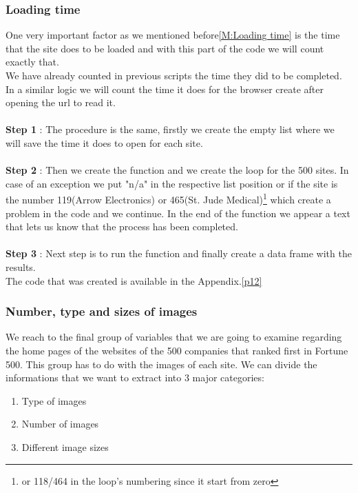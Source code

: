 \documentclass{article}
\begin{document}
\subsubsection{Loading time}
One very important factor as we mentioned before\ref{M:Loading time} is the time that the site does to be loaded and with this part of the code we will count exactly that.\\
We have already counted in previous scripts the time they did to be completed. In a similar logic we will count the time it does for the browser create after opening the url to read it.\\\\
\textbf{Step 1} : The procedure is the same, firstly we create the empty list where we will save the time it does to open for each site. \\\\
\textbf{Step 2} : Then we create the function and we create the loop for the 500 sites. In case of an exception we put "n/a" in the respective list position or if the site is the number 119(Arrow Electronics) or 465(St. Jude Medical)\footnote{or 118/464 in the loop's numbering since it start from zero} which create a problem in the code and we continue. In the end of the function we appear a text that lets us know that the process has been completed.\\\\
\textbf{Step 3} : Next step is to run the function and finally create a data frame with the results.\\
The code that was created is available in the Appendix.\ref{p12}

\subsubsection{Number, type and sizes of images}
We reach to the final group of variables that we are going to examine regarding the home pages of the websites of the 500 companies that ranked first in Fortune 500. This group has to do with the images of each site. We can divide the informations that we want to extract into 3 major categories:
\begin{enumerate}
\item Type of images
\item Number of images
\item Different image sizes
\end{enumerate}
\end{document}
